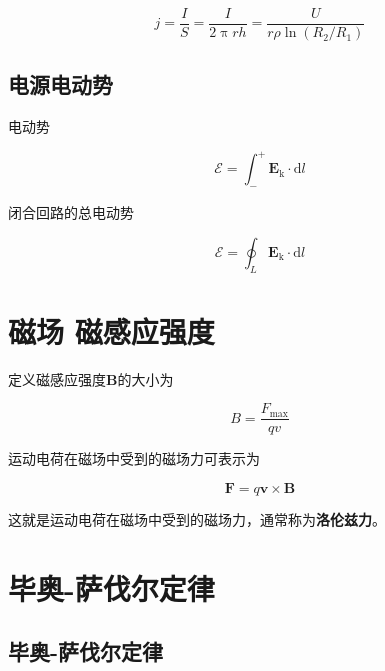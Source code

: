 \documentclass[
	12pt, %
	a4paper, %
]{myLegrandOrangeBook}
\newcommand{\rmd}{\mathrm{d}}
\begin{document}
\begin{equation*}
    j = \frac{I}{S} = \frac{I}{2 \uppi r h} = \frac{U}{r \rho \ln(R_2/R_1)}
\end{equation*}

\subsection{电源\quad 电动势}

电动势

\begin{equation}
    \mathscr{E} = \int_{-}^{+} \mathbf{E}_{\text{k}} \cdot \rmd l
\end{equation}

闭合回路的总电动势

\begin{equation}
    \mathscr{E} = \oint_L \mathbf{E}_{\text{k}} \cdot \rmd l
\end{equation}

\section{磁场 \quad 磁感应强度}

定义磁感应强度\(\mathbf{B}\)的大小为

\begin{equation}
    B = \frac{F_{\text{max}}}{qv}
\end{equation}

运动电荷在磁场中受到的磁场力可表示为

\begin{equation}
    \mathbf{F} = q \mathbf{v} \times \mathbf{B}
\end{equation}

这就是运动电荷在磁场中受到的磁场力，通常称为\textbf{洛伦兹力}。

\section{毕奥-萨伐尔定律}

\subsection{毕奥-萨伐尔定律}
\end{document}
